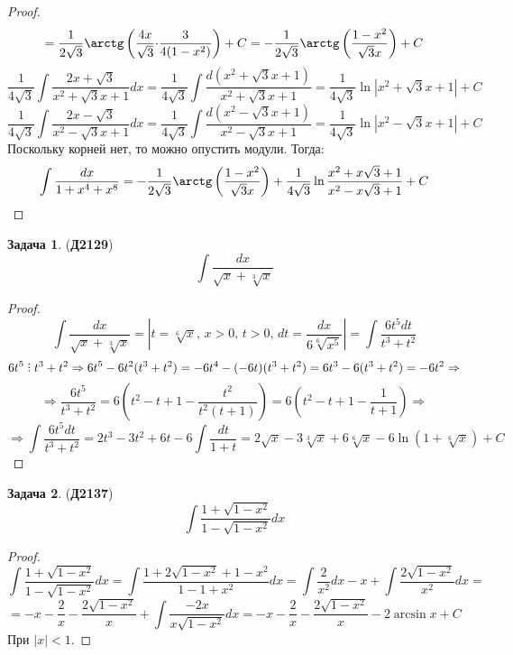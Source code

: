 \documentclass[12pt]{article}
\theoremstyle{definition}
\newtheorem{problem}{Задача}
\DeclareRobustCommand{\divby}{%
	\mathrel{\text{\vbox{\baselineskip.65ex\lineskiplimit0pt\hbox{.}\hbox{.}\hbox{.}}}}%
}
\DeclareMathOperator{\dint}{\displaystyle\int}
\begin{document}
\begin{proof}
$$	$$
	$$
		=\dfrac{1}{2\sqrt{3}}\arctg\left(\dfrac{4x}{\sqrt{3}}{\cdot}\dfrac{3}{4(1-x^2)}\right) + C = - \dfrac{1}{2\sqrt{3}}\arctg\left(\dfrac{1-x^2}{\sqrt{3}x}\right) + C
	$$
	$$
		\dfrac{1}{4\sqrt{3}}\dint\dfrac{2x + \sqrt{3}}{x^2 + \sqrt{3}x + 1}dx = \dfrac{1}{4\sqrt{3}}\dint \dfrac{d(x^2 + \sqrt{3}x + 1)}{x^2 + \sqrt{3}x + 1} = \dfrac{1}{4\sqrt{3}}\ln|x^2 + \sqrt{3}x + 1| + C
	$$
	$$
		\dfrac{1}{4\sqrt{3}}\dint\dfrac{2x - \sqrt{3}}{x^2 - \sqrt{3}x + 1}dx = \dfrac{1}{4\sqrt{3}}\dint \dfrac{d(x^2 - \sqrt{3}x + 1)}{x^2 - \sqrt{3}x + 1} = \dfrac{1}{4\sqrt{3}}\ln|x^2 - \sqrt{3}x + 1| + C
	$$
	Поскольку корней нет, то можно опустить модули. Тогда:
	$$
		\dint \dfrac{dx}{1 + x^4 + x^8} = - \dfrac{1}{2\sqrt{3}}\arctg\left(\dfrac{1-x^2}{\sqrt{3}x}\right) + \dfrac{1}{4\sqrt{3}}\ln\dfrac{x^2 + x\sqrt{3} + 1}{x^2 - x\sqrt{3} + 1} + C
	$$
\end{proof}
\begin{problem}(\textbf{Д2129})
	$$
		\dint \dfrac{dx}{\sqrt{x} + \sqrt[3]{x}}
	$$
\end{problem}
\begin{proof}
	$$
		\dint \dfrac{dx}{\sqrt{x} + \sqrt[3]{x}} = \left|t = \sqrt[6]{x}, \, x > 0, \, t > 0, \, dt = \dfrac{dx}{6\sqrt[6]{x^5}}\right| = \dint \dfrac{6t^5dt}{t^3 + t^2}
	$$
	$$
		6t^5 \divby t^3 + t^2 \Rightarrow 6t^5 - 6t^2(t^3 + t^2) = -6t^4 - (-6t)(t^3 + t^2) = 6t^3 - 6(t^3 + t^2) = -6t^2 \Rightarrow
	$$
	$$
		\Rightarrow \dfrac{6t^5}{t^3 + t^2} = 6\left(t^2 - t + 1 - \dfrac{t^2}{t^2(t + 1)} \right) = 6\left(t^2 - t + 1 - \dfrac{1}{t + 1}\right) \Rightarrow
	$$
	$$
		\Rightarrow \dint \dfrac{6t^5dt}{t^3 + t^2} = 2t^3 -3t^2 + 6t - 6 \dint\dfrac{dt}{1 + t} = 2\sqrt{x} - 3\sqrt[3]{x} + 6\sqrt[6]{x} - 6\ln(1 + \sqrt[6]{x}) + C  
	$$
\end{proof}




\begin{problem}(\textbf{Д2137})
	$$
		\dint \dfrac{1 + \sqrt{1 - x^2}}{1 - \sqrt{1 - x^2}}dx 
	$$
\end{problem}
\begin{proof}
	$$
		\dint \dfrac{1 + \sqrt{1 - x^2}}{1 - \sqrt{1 - x^2}}dx = \dint \dfrac{1 + 2\sqrt{1 - x^2} + 1 - x^2}{1 -1 + x^2}dx = \dint\dfrac{2}{x^2}dx - x + \dint\dfrac{2\sqrt{1-x^2}}{x^2}dx = 
	$$
	$$
		= -x - \dfrac{2}{x} - \dfrac{2\sqrt{1 - x^2}}{x} + \dint \dfrac{-2x}{x\sqrt{1 - x^2}}dx = -x - \dfrac{2}{x} - \dfrac{2\sqrt{1 - x^2}}{x} -2\arcsin{x} + C 
	$$
	При $|x| < 1$.
\end{proof}
\end{document}
